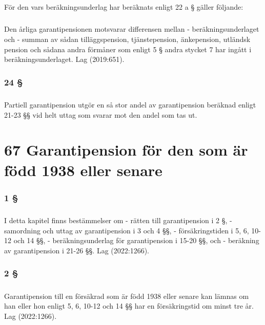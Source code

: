 \documentclass[a4paper,notitlepage,openany,10pt]{book}
\begin{document}
\paragraph*{}
För den vars beräkningsunderlag har beräknats enligt 22 a § gäller följande:
\paragraph*{}
Den årliga garantipensionen motsvarar differensen mellan
\newline - beräkningsunderlaget och
\newline - summan av sådan tilläggspension, tjänstepension, änkepension, utländsk pension och sådana andra förmåner som enligt 5 § andra stycket 7 har ingått i beräkningsunderlaget.
Lag (2019:651).
\subsection*{24 §}
\paragraph*{}
Partiell garantipension utgör en så stor andel av garantipension beräknad enligt 21-23 §§ vid helt uttag som svarar mot den andel som tas ut.
\chapter*{67 Garantipension för den som är född 1938 eller senare}
\subsection*{1 §}
\paragraph*{}
I detta kapitel finns bestämmelser om
\newline - rätten till garantipension i 2 §,
\newline - samordning och uttag av garantipension i 3 och 4 §§,
\newline - försäkringstiden i 5, 6, 10-12 och 14 §§,
\newline - beräkningsunderlag för garantipension i 15-20 §§, och
\newline - beräkning av garantipension i 21-26 §§.
Lag (2022:1266).
\subsection*{2 §}
\paragraph*{}
Garantipension till en försäkrad som är född 1938 eller senare kan lämnas om han eller hon enligt 5, 6, 10-12 och 14 §§ har en försäkringstid om minst tre år.
Lag (2022:1266).
\end{document}
